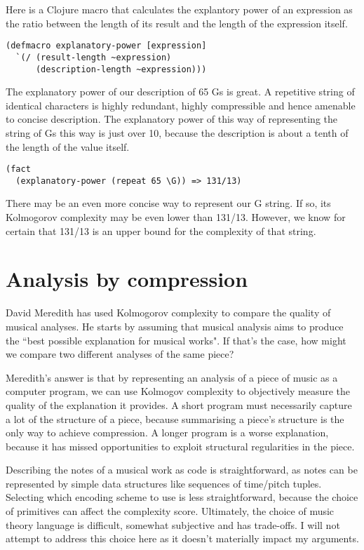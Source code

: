 \documentclass[numbers]{sigplanconf}
\begin{document}
Here is a Clojure macro that calculates the explantory power of an expression as the ratio between the length of its
result and the length of the expression itself.

\begin{verbatim}
(defmacro explanatory-power [expression]
  `(/ (result-length ~expression)
      (description-length ~expression)))
\end{verbatim}

The explanatory power of our description of 65 Gs is great. A repetitive string of identical characters is
highly redundant, highly compressible and hence amenable to concise description. The explanatory power of this way of
representing the string of Gs this way is just over 10, because the description is about a tenth of the length of the
value itself.

\begin{verbatim}
(fact
  (explanatory-power (repeat 65 \G)) => 131/13)
\end{verbatim}

There may be an even more concise way to represent our G string. If so, its Kolmogorov complexity may be even lower than
131/13. However, we know for certain that 131/13 is an upper bound for the complexity of that string.

\section{Analysis by compression}

David Meredith has used Kolmogorov complexity to compare the quality of musical analyses\cite{Analysis by Compression}.
He starts by assuming that musical analysis aims to produce the ``best possible explanation for musical works". If that's the case,
how might we compare two different analyses of the same piece?

Meredith's answer is that by representing an analysis of a piece of music as a computer program, we can use Kolmogov complexity
to objectively measure the quality of the explanation it provides. A short program must necessarily capture a lot of the structure
of a piece, because summarising a piece's structure is the only way to achieve compression. A longer program is a worse explanation,
because it has missed opportunities to exploit structural regularities in the piece.

Describing the notes of a musical work as code is straightforward, as notes can be represented by simple data structures like
sequences of time/pitch tuples. Selecting which encoding scheme to use is less straightforward, because the choice of primitives
can affect the complexity score. Ultimately, the choice of music theory language is difficult, somewhat subjective and
has trade-offs. I will not attempt to address this choice here as it doesn't materially impact my arguments.
\end{document}

